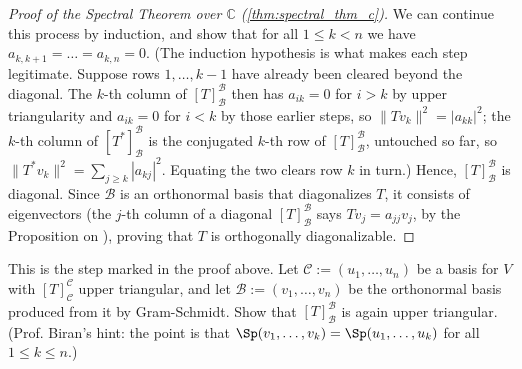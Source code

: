 \begin{proof}[Proof of the Spectral Theorem over $\mathbb{C}$ (\cref{thm:spectral_thm_c})]
We can continue this process by induction, and show that for all $1 \leq k < n$ we have $a_{k, k+1} = \dots = a_{k,n} = 0$. (The induction hypothesis is what makes each step legitimate. Suppose rows $1, \dots, k-1$ have already been cleared beyond the diagonal. The $k$-th column of $[T]_{\mathcal{B}}^{\mathcal{B}}$ then has $a_{ik} = 0$ for $i > k$ by upper triangularity and $a_{ik} = 0$ for $i < k$ by those earlier steps, so $\|Tv_k\|^2 = |a_{kk}|^2$; the $k$-th column of $[T^*]_{\mathcal{B}}^{\mathcal{B}}$ is the conjugated $k$-th row of $[T]_{\mathcal{B}}^{\mathcal{B}}$, untouched so far, so $\|T^*v_k\|^2 = \sum_{j \geq k} |a_{kj}|^2$. Equating the two clears row $k$ in turn.) Hence, $[T]_{\mathcal{B}}^{\mathcal{B}}$ is diagonal. Since $\mathcal{B}$ is an orthonormal basis that diagonalizes $T$, it consists of eigenvectors (the $j$-th column of a diagonal $[T]_{\mathcal{B}}^{\mathcal{B}}$ says $Tv_j = a_{jj} v_j$, by the Proposition on ), proving that $T$ is orthogonally diagonalizable.
\end{proof}

\begin{exercise}
\label{exc:gram_schmidt_keeps_triangular}
This is the step marked  in the proof above. Let $\mathcal{C} := (u_1, \dots, u_n)$ be a basis for $V$ with $[T]_{\mathcal{C}}^{\mathcal{C}}$ upper triangular, and let $\mathcal{B} := (v_1, \dots, v_n)$ be the orthonormal basis produced from it by Gram-Schmidt. Show that $[T]_{\mathcal{B}}^{\mathcal{B}}$ is again upper triangular. (Prof. Biran's hint: the point is that $\Sp(v_1, \dots, v_k) = \Sp(u_1, \dots, u_k)$ for all $1 \leq k \leq n$.)
\end{exercise}

